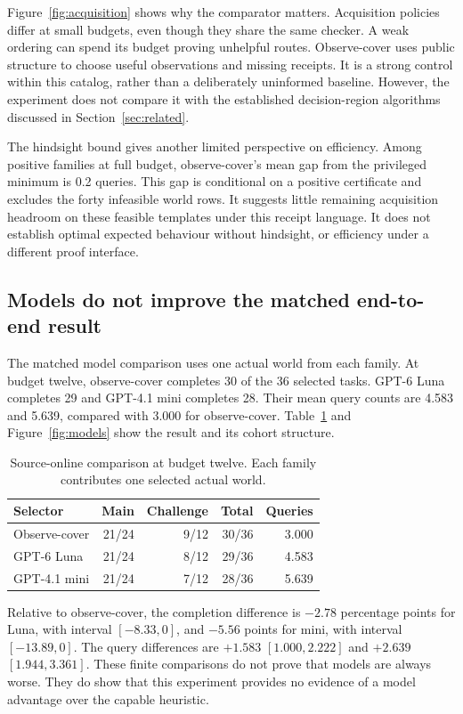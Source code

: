 \documentclass[conference]{IEEEtran}
\begin{document}
Figure~\ref{fig:acquisition} shows why the comparator matters. Acquisition policies differ at small budgets, even though they share the same checker. A weak ordering can spend its budget proving unhelpful routes. Observe-cover uses public structure to choose useful observations and missing receipts. It is a strong control within this catalog, rather than a deliberately uninformed baseline. However, the experiment does not compare it with the established decision-region algorithms discussed in Section~\ref{sec:related}.

The hindsight bound gives another limited perspective on efficiency. Among positive families at full budget, observe-cover's mean gap from the privileged minimum is 0.2 queries. This gap is conditional on a positive certificate and excludes the forty infeasible world rows. It suggests little remaining acquisition headroom on these feasible templates under this receipt language. It does not establish optimal expected behaviour without hindsight, or efficiency under a different proof interface.

\subsection{Models do not improve the matched end-to-end result}
The matched model comparison uses one actual world from each family. At budget twelve, observe-cover completes 30 of the 36 selected tasks. GPT-6 Luna completes 29 and GPT-4.1 mini completes 28. Their mean query counts are 4.583 and 5.639, compared with 3.000 for observe-cover. Table~\ref{tab:model} and Figure~\ref{fig:models} show the result and its cohort structure.

\begin{table}[t]
\centering
\caption{Source-online comparison at budget twelve. Each family contributes one selected actual world.}
\label{tab:model}
\begin{tabular}{lrrrr}
\toprule
Selector & Main & Challenge & Total & Queries\\
\midrule
Observe-cover &21/24&9/12&30/36&3.000\\
GPT-6 Luna &21/24&8/12&29/36&4.583\\
GPT-4.1 mini &21/24&7/12&28/36&5.639\\
\bottomrule
\end{tabular}
\end{table}

Relative to observe-cover, the completion difference is $-2.78$ percentage points for Luna, with interval $[-8.33,0]$, and $-5.56$ points for mini, with interval $[-13.89,0]$. The query differences are $+1.583$ $[1.000,2.222]$ and $+2.639$ $[1.944,3.361]$. These finite comparisons do not prove that models are always worse. They do show that this experiment provides no evidence of a model advantage over the capable heuristic.
\end{document}
